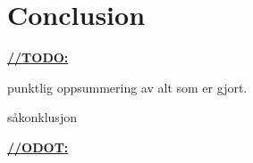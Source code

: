 \chapter{Conclusion}

\underline{\textbf{\LARGE //TODO:}}

punktlig oppsummering av alt som er gjort.

s\aa konklusjon

\underline{\textbf{\LARGE //ODOT:}}